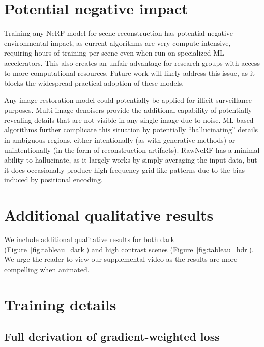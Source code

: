 
\section{Potential negative impact}

Training any NeRF model for scene reconstruction has potential negative environmental impact, as current algorithms are very compute-intensive, requiring hours of training per scene even when run on specialized ML accelerators. This also creates an unfair advantage for research groups with access to more computational resources. Future work will likely address this issue, as it blocks the widespread practical adoption of these models.

Any image restoration model could potentially be applied for illicit surveillance purposes. Multi-image denoisers provide the additional capability of potentially revealing details that are not visible in any single image due to noise. ML-based algorithms further complicate this situation by potentially ``hallucinating'' details in ambiguous regions, either intentionally (as with generative methods) or unintentionally (in the form of reconstruction artifacts). RawNeRF has a minimal ability to hallucinate, as it largely works by simply averaging the input data, but it does occasionally produce high frequency grid-like patterns due to the bias induced by positional encoding.



\section{Additional qualitative results}

We include additional qualitative results for both dark (Figure~\ref{fig:tableau_dark}) and high contrast scenes (Figure~\ref{fig:tableau_hdr}). We urge the reader to view our supplemental video as the results are more compelling when animated.

\newcommand{\tableauheight}{4cm}
\newcommand{\tableauinheight}{1.25cm}





\section{Training details}


\subsection{Full derivation of gradient-weighted loss}

